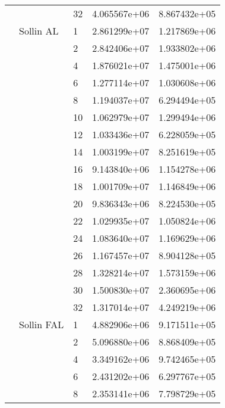 \begin{tabular}{lllrr}
                      &            & 32 &  4.065567e+06 &  8.867432e+05 \\
                      & Sollin AL & 1  &  2.861299e+07 &  1.217869e+06 \\
                      &            & 2  &  2.842406e+07 &  1.933802e+06 \\
                      &            & 4  &  1.876021e+07 &  1.475001e+06 \\
                      &            & 6  &  1.277114e+07 &  1.030608e+06 \\
                      &            & 8  &  1.194037e+07 &  6.294494e+05 \\
                      &            & 10 &  1.062979e+07 &  1.299494e+06 \\
                      &            & 12 &  1.033436e+07 &  6.228059e+05 \\
                      &            & 14 &  1.003199e+07 &  8.251619e+05 \\
                      &            & 16 &  9.143840e+06 &  1.154278e+06 \\
                      &            & 18 &  1.001709e+07 &  1.146849e+06 \\
                      &            & 20 &  9.836343e+06 &  8.224530e+05 \\
                      &            & 22 &  1.029935e+07 &  1.050824e+06 \\
                      &            & 24 &  1.083640e+07 &  1.169629e+06 \\
                      &            & 26 &  1.167457e+07 &  8.904128e+05 \\
                      &            & 28 &  1.328214e+07 &  1.573159e+06 \\
                      &            & 30 &  1.500830e+07 &  2.360695e+06 \\
                      &            & 32 &  1.317014e+07 &  4.249219e+06 \\
                      & Sollin FAL & 1  &  4.882906e+06 &  9.171511e+05 \\
                      &            & 2  &  5.096880e+06 &  8.868409e+05 \\
                      &            & 4  &  3.349162e+06 &  9.742465e+05 \\
                      &            & 6  &  2.431202e+06 &  6.297767e+05 \\
                      &            & 8  &  2.353141e+06 &  7.798729e+05 \\

\end{tabular}
